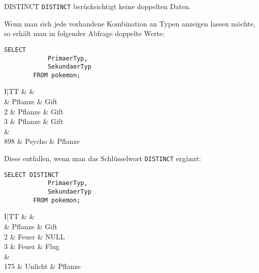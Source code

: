 \begin{sql}{DISTINCT}
    \texttt{DISTINCT} berücksichtigt keine doppelten Daten.

    Wenn man sich jede vorhandene Kombination an Typen anzeigen lassen möchte, so erhält man in folgender Abfrage doppelte Werte:

    \begin{lstlisting}[language=mysql]
        SELECT
            PrimaerTyp,
            SekundaerTyp
        FROM pokemon;
    \end{lstlisting}

    \setcounter{rownum}{0}
    \begin{tabular}{I|TT}
                                   &  &  \\                          & Pflanze                        & Gift                             \\
        2                          & Pflanze                        & Gift                             \\
        3                          & Pflanze                        & Gift                             \\
         &                                          \\
        898                        & Psycho                         & Pflanze                          \\
    \end{tabular}
    \vspace{1em}

    Diese entfallen, wenn man das Schlüsselwort \texttt{DISTINCT} ergänzt:

    \begin{lstlisting}[language=mysql]
        SELECT DISTINCT
            PrimaerTyp,
            SekundaerTyp
        FROM pokemon;
    \end{lstlisting}

    \setcounter{rownum}{0}
    \begin{tabular}{I|TT}
                                   &  &  \\                          & Pflanze                        & Gift                             \\
        2                          & Feuer                          & NULL                             \\
        3                          & Feuer                          & Flug                             \\
         &                                          \\
        175                        & Unlicht                        & Pflanze                          \\
    \end{tabular}
\end{sql}

